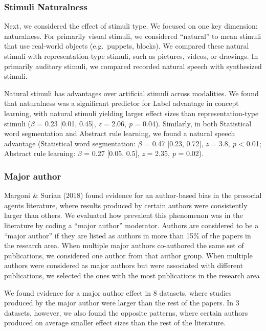 \documentclass[10pt, letterpaper]{article}
\begin{document}
\hypertarget{stimuli-naturalness}{%
\subsubsection{Stimuli Naturalness}\label{stimuli-naturalness}}

Next, we considered the effect of stimuli type. We focused on one key
dimension: naturalness. For primarily visual stimuli, we considered
``natural'' to mean stimuli that use real-world objects (e.g.~puppets,
blocks). We compared these natural stimuli with representation-type
stimuli, such as pictures, videos, or drawings. In primarily auditory
stimuli, we compared recorded natural speech with synthesized stimuli.

Natural stimuli has advantages over artificial stimuli across
modalities. We found that naturalness was a significant predictor for
Label advantage in concept learning, with natural stimuli yielding
larger effect sizes than representation-type stimuli (\(\beta\) = 0.23
{[}0.01, 0.45{]}, \emph{z} = 2.06, \emph{p} = 0.04). Similarly, in both
Statistical word segmentation and Abstract rule learning, we found a
natural speech advantage (Statistical word segmentation: \(\beta\) =
0.47 {[}0.23, 0.72{]}, \emph{z} = 3.8, \emph{p} \textless{} 0.01;
Abstract rule learning: \(\beta\) = 0.27 {[}0.05, 0.5{]}, \emph{z} =
2.35, \emph{p} = 0.02).

\hypertarget{major-author}{%
\subsubsection{Major author}\label{major-author}}

Margoni \& Surian (2018) found evidence for an author-based bias in the
prosocial agents literature, where results produced by certain authors
were consistently larger than others. We evaluated how prevalent this
phenomenon was in the literature by coding a ``major author'' moderator.
Authors are considered to be a ``major author'' if they are listed as
authors in more than 15\% of the papers in the research area. When
multiple major authors co-authored the same set of publications, we
considered one author from that author group. When multiple authors were
considered as major authors but were associated with different
publications, we selected the ones with the most publications in the
research area

We found evidence for a major author effect in 8 datasets, where studies
produced by the major author were larger than the rest of the papers. In
3 datasets, however, we also found the opposite patterns, where certain
authors produced on average smaller effect sizes than the rest of the
literature.
\end{document}

